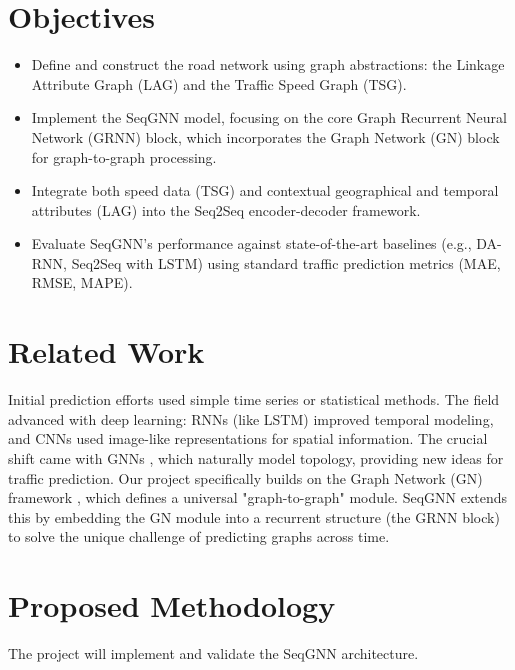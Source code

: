 \documentclass[11pt, a4paper]{article}
\begin{document}
\section*{Objectives}
\begin{itemize}
    \item Define and construct the road network using graph abstractions: the Linkage Attribute Graph (LAG) and the Traffic Speed Graph (TSG).
    \item Implement the SeqGNN model, focusing on the core Graph Recurrent Neural Network (GRNN) block, which incorporates the Graph Network (GN) block for graph-to-graph processing.
    \item Integrate both speed data (TSG) and contextual geographical and temporal attributes (LAG) into the Seq2Seq encoder-decoder framework.
    \item Evaluate SeqGNN's performance against state-of-the-art baselines (e.g., DA-RNN, Seq2Seq with LSTM) using standard traffic prediction metrics (MAE, RMSE, MAPE).
\end{itemize}

\section*{Related Work}
Initial prediction efforts used simple time series or statistical methods. The field advanced with deep learning: RNNs (like LSTM) improved temporal modeling, and CNNs used image-like representations for spatial information. The crucial shift came with GNNs , which naturally model topology, providing new ideas for traffic prediction. Our project specifically builds on the Graph Network (GN) framework , which defines a universal "graph-to-graph" module. SeqGNN extends this by embedding the GN module into a recurrent structure (the GRNN block) to solve the unique challenge of predicting graphs across time.

\section*{Proposed Methodology}
The project will implement and validate the SeqGNN architecture.
\end{document}
